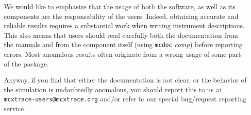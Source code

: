 We would like to emphasize that the usage of both the \MCX software, as well as
its components are the responsability of the users. Indeed, obtaining accurate
and reliable results requires a substantial work when writing instrument
descriptions. This also means that users should read carefully both the
documentation from the manuals \cite{mcxtracemanual} and from the component
itself (using \verb+mcdoc+ \textit{comp}) before reporting errors. Most
anomalous results often originate from a wrong usage of some part of the
package.

Anyway, if you find that either the documentation is not clear, or the behavior
of the simulation is undoubtedly anomalous, you should report this to us at
\hbox{\texttt{mcxtrace-users@mcxtrace.org}} and/or refer to our special bug/request reporting service
\cite{mczilla_webpage}.
